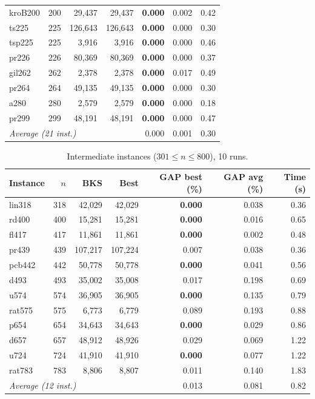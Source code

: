\documentclass[runningheads]{llncs}
\begin{document}
\begin{table}
\begin{tabular}{@{}lrrrrrr@{}}
kroB200 & 200 & 29{,}437 & 29{,}437 & \textbf{0.000} & 0.002 & 0.42 \\
ts225 & 225 & 126{,}643 & 126{,}643 & \textbf{0.000} & 0.000 & 0.30 \\
tsp225 & 225 & 3{,}916 & 3{,}916 & \textbf{0.000} & 0.000 & 0.46 \\
pr226 & 226 & 80{,}369 & 80{,}369 & \textbf{0.000} & 0.000 & 0.37 \\
gil262 & 262 & 2{,}378 & 2{,}378 & \textbf{0.000} & 0.017 & 0.49 \\
pr264 & 264 & 49{,}135 & 49{,}135 & \textbf{0.000} & 0.000 & 0.30 \\
a280 & 280 & 2{,}579 & 2{,}579 & \textbf{0.000} & 0.000 & 0.18 \\
pr299 & 299 & 48{,}191 & 48{,}191 & \textbf{0.000} & 0.000 & 0.47 \\
\midrule
\multicolumn{4}{l}{\textit{Average (21 inst.)}} & 0.000 & 0.001 & 0.30 \\
\bottomrule
\end{tabular}
\end{table}

\begin{table}
\caption{Intermediate instances ($301\le n\le 800$), 10 runs.}
\label{tab:inter}
\centering\scriptsize
\begin{tabular}{@{}lrrrrrr@{}}
\toprule
\textbf{Instance} & $n$ & \textbf{BKS} & \textbf{Best} & \textbf{GAP best (\%)} & \textbf{GAP avg (\%)} & \textbf{Time (s)}\\
\midrule
lin318 & 318 & 42{,}029 & 42{,}029 & \textbf{0.000} & 0.038 & 0.36 \\
rd400 & 400 & 15{,}281 & 15{,}281 & \textbf{0.000} & 0.016 & 0.65 \\
fl417 & 417 & 11{,}861 & 11{,}861 & \textbf{0.000} & 0.002 & 0.48 \\
pr439 & 439 & 107{,}217 & 107{,}224 & 0.007 & 0.038 & 0.36 \\
pcb442 & 442 & 50{,}778 & 50{,}778 & \textbf{0.000} & 0.041 & 0.56 \\
d493 & 493 & 35{,}002 & 35{,}008 & 0.017 & 0.198 & 0.69 \\
u574 & 574 & 36{,}905 & 36{,}905 & \textbf{0.000} & 0.135 & 0.79 \\
rat575 & 575 & 6{,}773 & 6{,}779 & 0.089 & 0.193 & 0.88 \\
p654 & 654 & 34{,}643 & 34{,}643 & \textbf{0.000} & 0.029 & 0.86 \\
d657 & 657 & 48{,}912 & 48{,}926 & 0.029 & 0.069 & 1.22 \\
u724 & 724 & 41{,}910 & 41{,}910 & \textbf{0.000} & 0.077 & 1.22 \\
rat783 & 783 & 8{,}806 & 8{,}807 & 0.011 & 0.140 & 1.83 \\
\midrule
\multicolumn{4}{l}{\textit{Average (12 inst.)}} & 0.013 & 0.081 & 0.82 \\
\bottomrule
\end{tabular}
\end{table}
\end{document}
